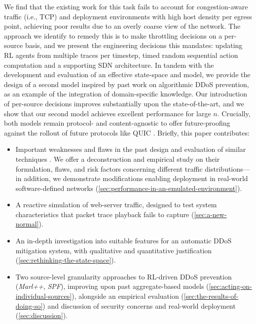 \documentclass[conference, a4paper, 10pt, times]{IEEEtran}
\begin{document}
We find that the existing work for this task fails to account for congestion-aware traffic (i.e., TCP) and deployment environments with high host density per egress point, achieving poor results due to an overly coarse view of the network.
The approach we identify to remedy this is to make throttling decisions on a per-source basis, and we present the engineering decisions this mandates: updating RL agents from multiple traces per timestep, timed random sequential action computation and a supporting SDN architecture.
In tandem with the development and evaluation of an effective state-space and model, we provide the design of a second model inspired by past work on algorithmic DDoS prevention, as an example of the integration of domain-specific knowledge.
Our introduction of per-source decisions improves substantially upon the state-of-the-art, and we show that our second model achieves excellent performance for large $n$.
Crucially, both models remain protocol- and content-agnostic to offer future-proofing against the rollout of future protocols like QUIC \cite{DBLP:conf/sigcomm/LangleyRWVKZYKS17}.
Briefly, this paper contributes:
\begin{itemize}
	\item Important weaknesses and flaws in the past design and evaluation of similar techniques \cite{DBLP:journals/eaai/MalialisK15}. We offer a deconstruction and empirical study on their formulation, flaws, and risk factors concerning different traffic distributions---in addition, we demonstrate modifications enabling deployment in real-world software-defined networks (\cref{sec:performance-in-an-emulated-environment}).
	\item A reactive simulation of web-server traffic, designed to test system characteristics that packet trace playback fails to capture (\cref{sec:a-new-normal}).
	\item An in-depth investigation into suitable features for an automatic DDoS mitigation system, with qualitative and quantitative justification (\cref{sec:rethinking-the-state-space}).
	\item Two source-level granularity approaches to RL-driven DDoS prevention (\emph{Marl++}, \emph{SPF}), improving upon past aggregate-based models (\cref{sec:acting-on-individual-sources}), alongside an empirical evaluation (\cref{sec:the-results-of-doing-so}) and discussion of security concerns and real-world deployment (\cref{sec:discussion}).
\end{itemize}
\end{document}
